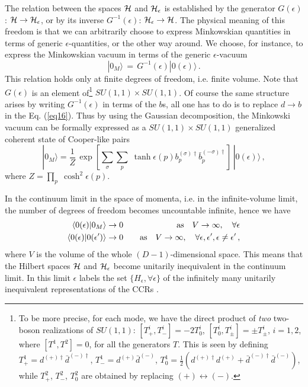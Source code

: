 \noindent The relation between the spaces ${\cal H}$ and ${\cal
H}_{\epsilon}$ is established by the generator $G(\epsilon)$:
${\cal H} \to {\cal H}_{\epsilon}$, or by its inverse
$G^{-1}(\epsilon)$: ${\cal H}_\epsilon \to {\cal H}$. The physical
meaning of this freedom is that we can arbitrarily choose to
express Minkowskian quantities in terms of generic
$\epsilon$-quantities, or the other way around. We choose, for
instance, to express the Minkowskian vacuum in terms of the
generic $\epsilon$-vacuum
 \begin{equation}\label{19}
 |0_M\rangle \, = \,G^{-1}(\epsilon)|0 (\epsilon) \rangle \,.
 \end{equation}
This relation holds only at finite degrees of freedom, i.e. finite
volume. Note that $G(\epsilon)$ is an element of\footnote{To be
more precise, for each mode, we have the direct product of {\it
two} two-boson realizations of $SU(1,1)$: $[T^i_+,T^i_-]=
-2T^i_0$, $[T^i_0,T^i_\pm]=\pm T^i_\pm$, $i=1,2$, where
$[T^1,T^2]=0$, for all the generators $T$. This is seen by
defining $T^1_+ = d^{(+) \dagger} \bar{d}^{(-) \dagger}$, $T^1_-=
d^{(+)} \bar{d}^{(-)}$, $T^1_0 = \frac{1}{2} (d^{(+) \dagger}
d^{(+)} + \bar{d}^{(-) \dagger} \bar{d}^{(-)})$, while $T^2_+$,
$T^2_-$, $T^2_0$ are obtained by replacing $(+) \leftrightarrow
(-)$.} $SU(1, 1) \times SU(1, 1)$. Of course the same structure
arises by writing $G^{-1}(\epsilon)$ in terms of the $b$s, all one
has to do is to replace $d \to b$ in the Eq. (\ref{eq16}). Thus by
using the Gaussian decomposition, the Minkowski vacuum can be
formally expressed as a $SU(1,1) \times SU(1,1)$ generalized
coherent state \cite{PER} of Cooper-like pairs
 \begin{equation}\label{26}
 |0_M\rangle =\frac{1}{Z}\,\exp\left[{\sum_{\sigma} \sum_p \;\tanh\epsilon (p)
 b_p^{(\sigma)\dagger} \bar{b}_{\tilde
 p}^{(-\sigma)\dagger}}\right]\, |0(\epsilon)\rangle\,{,}
 \end{equation}
where $Z= \prod_p\;\cosh^2\epsilon(p)$.

\noindent In the continuum limit in the space of momenta, i.e. in
the infinite-volume limit, the number of degrees of freedom
becomes uncountable infinite, hence we have
\begin{eqnarray}
 \langle 0(\epsilon)| 0_M\rangle \to 0 & &\quad {\rm as}
 \quad  V\to\infty, \quad \forall
 \epsilon
 \label{eq27} \\
  \langle 0(\epsilon)|0(\epsilon^{\prime})\rangle\to 0 & &\quad {\rm as} \quad
   V\to\infty, \quad \forall
  \epsilon, \epsilon^{\prime}, \epsilon\ne \epsilon^{\prime}\,{,}
  \label{eq28}
\end{eqnarray}
where $V$ is the volume of the whole $(D-1)$-dimensional space.
This means that the Hilbert spaces ${\cal H}$ and ${\cal
H}_\epsilon$ become unitarily inequivalent in the continuum limit.
In this limit $\epsilon$ labels the set $\{H_\epsilon, \forall
\epsilon\}$ of the infinitely many unitarily inequivalent
representations of the CCRs \cite{umezawa,strocchi}.

